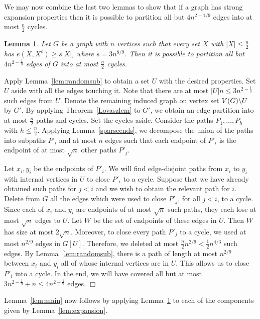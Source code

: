 \documentclass[11pt]{article}
\newtheorem{lemma}[theorem]{Lemma}
\newenvironment{proof}
      {\medskip\noindent{\bf Proof:}\hspace{1mm}}
      {\hfill$\Box$\medskip}
\begin{document}
We may now combine the last two lemmas to show that if a graph has strong expansion properties then it is possible to partition all but $4n^{2 - 1/9}$ edges into at most $\frac{n}{2}$ cycles.

\begin{lemma} \label{lem:keycomp}
Let $G$ be a graph with $n$ vertices such that every set $X$ with $|X| \leq \frac{n}{2}$ has $e(X, X^c) \geq s |X|$, where $s = 3 n^{8/9}$. Then it is possible to partition all but $4 n^{2 - \frac{1}{9}}$ edges of $G$ into at most $\frac{n}{2}$ cycles.
\end{lemma}

\begin{proof}
Apply Lemma~\ref{lem:randomsub} to obtain a set $U$ with the desired properties. Set $U$ aside with all the edges touching it. Note that there are at most $|U| n \leq 3 n^{2 - \frac{1}{9}}$ such edges from $U$. Denote the remaining induced graph on vertex set $V(G)\char92 U$ by $G'$. By applying Theorem~\ref{Lovaszlem} to $G'$, we obtain an edge partition into at most $\frac{n}{2}$ paths and cycles. Set the cycles aside. Consider the paths $P_1, \dots, P_h$ with $h \leq \frac{n}{2}$. Applying Lemma~\ref{sparseends}, we decompose the union of the paths into subpaths $P'_i$ and at most $n$ edges such that each endpoint of $P'_i$ is the endpoint of at most $\sqrt{n}$ other paths $P'_j$.

Let $x_i, y_i$ be the endpoints of $P'_i$. We will find edge-disjoint paths from $x_i$ to $y_i$ with internal vertices in $U$ to close $P'_i$ to a cycle. Suppose that we have already obtained such paths for $j < i$ and we wish to obtain the relevant path for $i$. Delete from $G$ all the edges which were used to close $P'_j$, for all $j < i$, to a cycle. Since each of $x_i$ and $y_i$ are endpoints of at most $\sqrt{n}$ such paths, they each lose  at most $\sqrt{n}$ edges to $U$. Let $W$ be the set of endpoints of these edges in $U$. Then $W$ has size at most $2\sqrt{n}$. Moreover, to close every path $P'_j$ to a cycle, we used at most $n^{2/9}$ edges in $G[U]$. Therefore, we deleted at most $\frac{n}{2}n^{2/9}<\frac{1}{2} n^{4/3}$ such edges. By Lemma~\ref{lem:randomsub}, there is a path of length at most $n^{2/9}$ between $x_i$ and $y_i$ all of whose internal vertices are in $U$. This allows us to close $P'_i$ into a cycle. In the end, we will have covered all but at most $3 n^{2 - \frac{1}{9}} + n \leq 4 n^{2 - \frac{1}{9}}$ edges.
\end{proof}

Lemma~\ref{lem:main} now follows by applying Lemma~\ref{lem:keycomp} to each of the components given by Lemma~\ref{lem:expansion}.
\end{document}
